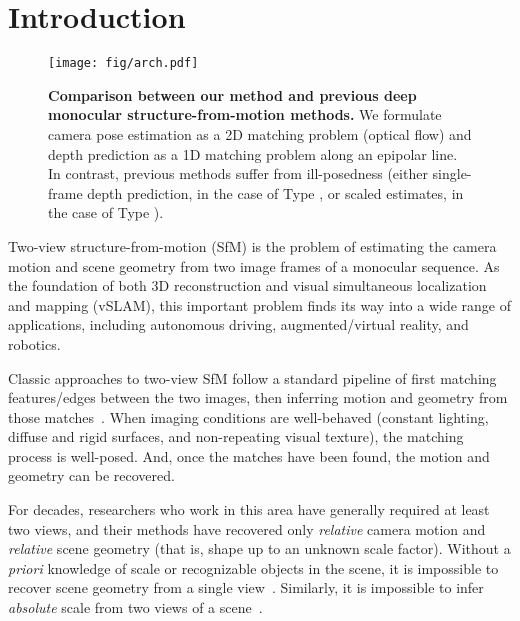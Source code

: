 \documentclass[final]{cvpr}
\begin{document}
\vspace{-3mm}

\section{Introduction}

\begin{figure*}[t]
\begin{center}
  \texttt{[image: fig/arch.pdf]}
\end{center}
\vspace{-4mm}
  \caption{\small \textbf{Comparison between our method and previous deep monocular structure-from-motion methods.} We formulate camera pose estimation as a 2D matching problem (optical flow) and depth prediction as a 1D matching problem along an epipolar line. In contrast, previous methods suffer from ill-posedness (either single-frame depth prediction, in the case of Type , or scaled estimates, in the case of Type ).}
\label{fig:compare_method_type}
\vspace{-4mm}
\end{figure*}

Two-view structure-from-motion (SfM) is the problem of estimating the camera motion and scene geometry from two image frames of a monocular sequence.
As the foundation of both 3D reconstruction and visual simultaneous localization and mapping (vSLAM), this important problem finds its way into a wide range of applications, including autonomous driving, augmented/virtual reality, and robotics.

Classic approaches to two-view SfM follow a standard pipeline of first matching features/edges between the two images, then inferring motion and geometry from those matches~\cite{davison2007pami:monoslam,klein2007ismar:ptam,mur2015orbslam,forster2014icra:svo,engel14eccv:lsdslam,engel2016dso,zhong2017self,zhong2020displacement}.
When imaging conditions are well-behaved (constant lighting, diffuse and rigid surfaces, and non-repeating visual texture), the matching process is well-posed.
And, once the matches have been found, the motion and geometry can be recovered.

For decades, researchers who work in this area have generally required at least two views, and their methods have recovered only \emph{relative} camera motion and \emph{relative} scene geometry (that is, shape up to an unknown scale factor).
Without a \emph{priori} knowledge of scale or recognizable objects in the scene, it is impossible to recover scene geometry from a single view~\cite{hassner2006cvprw,zhong18eccvmono,xie2019iccv:pix2vox,li2019bmvc:svosr}.  Similarly, it is impossible to infer \emph{absolute} scale from two views of a scene~\cite{hartley2003multiple}.
\end{document}
